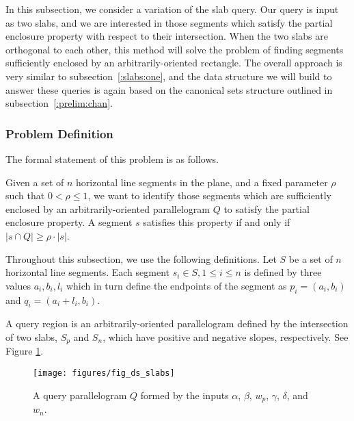 In this subsection, we consider a variation of the slab query. 
Our query is input as two slabs, and we are interested in those segments which satisfy the partial enclosure property with respect to their intersection.
When the two slabs are orthogonal to each other, this method will solve the problem of finding segments sufficiently enclosed by an arbitrarily-oriented rectangle.  
The overall approach is very similar to subsection~\ref{:slabs:one}, and the data structure we will build to answer these queries is again based on the canonical sets structure outlined in subsection~\ref{:prelim:chan}.


\subsubsection{Problem Definition}
\label{:slabs:two:problem}

The formal statement of this problem is as follows.

\begin{problem}
Given a set of $n$ horizontal line segments in the plane, and a fixed parameter $\rho$ such that $0 < \rho \leq 1$, we want to identify those segments which are sufficiently enclosed by an arbitrarily-oriented parallelogram $Q$ to satisfy the partial enclosure property.
A segment $s$ satisfies this property if and only if $|s \cap Q| \geq \rho \cdot |s|$.
\end{problem}

Throughout this subsection, we use the following definitions. 
Let $S$ be a set of $n$ horizontal line segments.
Each segment $s_i \in S, 1 \leq i \leq n$ is defined by three values $a_i, b_i, l_i$ which in turn define the endpoints of the segment as $p_i = (a_i, b_i)$ and $q_i = (a_i + l_i, b_i)$.

A query region is an arbitrarily-oriented parallelogram defined by the intersection of two slabs, $S_p$ and $S_n$, which have positive and negative slopes, respectively. See Figure \ref{fig:slabs:two:ds}.

\begin{figure}[t]
\begin{center}
  \texttt{[image: figures/fig\_ds\_slabs]}
  \caption{A query parallelogram $Q$ formed by the inputs $\alpha$, $\beta$, $w_p$,
  $\gamma$, $\delta$, and $w_n$.}
  \label{fig:slabs:two:ds}
\end{center}
\end{figure}

